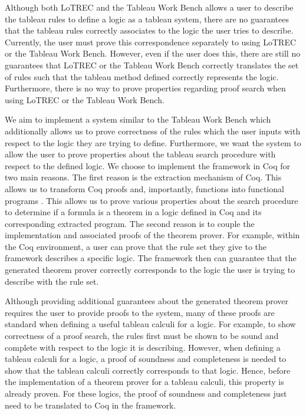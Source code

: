 \documentclass{llncs}
\begin{document}
Although both LoTREC and the Tableau Work Bench allows a user to describe the
tableau rules to define a logic as a tableau system, there are no guarantees
that the tableau rules correctly associates to the logic the user tries to
describe. Currently, the user must prove this correspondence separately to
using LoTREC or the Tableau Work Bench. However, even if the user does this,
there are still no guarantees that LoTREC or the Tableau Work Bench correctly
translates the set of rules such that the tableau method defined correctly
represents the logic. Furthermore, there is no way to prove properties
regarding proof search when using LoTREC or the Tableau Work Bench.

We aim to implement a system similar to the Tableau Work Bench which
additionally allows us to prove correctness of the rules which the user inputs
with respect to the logic they are trying to define. Furthermore, we want the
system to allow the user to prove properties about the tableau search procedure
with respect to the defined logic. We choose to implement the framework in Coq
for two main reasons.  The first reason is the extraction mechanism of Coq.
This allows us to transform Coq proofs and, importantly, functions into
functional programs \cite{letouzey2008extraction}.  This allows us to prove
various properties about the search procedure to determine if a formula is a
theorem in a logic defined in Coq and its corresponding extracted program. The
second reason is to couple the implementation and associated proofs of the
theorem prover. For example, within the Coq environment, a user can prove that
the rule set they give to the framework describes a specific logic. The
framework then can guarantee that the generated theorem prover correctly
corresponds to the logic the user is trying to describe with the rule set.

Although providing additional guarantees about the generated theorem prover
requires the user to provide proofs to the system, many of these proofs are
standard when defining a useful tableau calculi for a logic.  For example, to
show correctness of a proof search, the rules first must be shown to be sound
and complete with respect to the logic it is describing.  However, when
defining a tableau calculi for a logic, a proof of soundness and completeness
is needed to show that the tableau calculi correctly corresponds to that logic.
Hence, before the implementation of a theorem prover for a tableau calculi,
this property is already proven. For these logics, the proof of soundness and
completeness just need to be translated to Coq in the framework.
\end{document}
